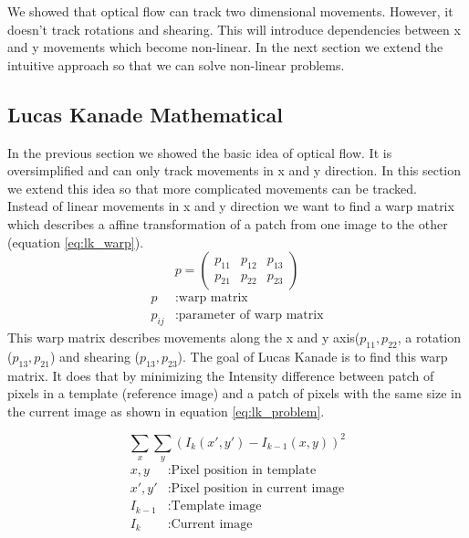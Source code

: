 \documentclass[11pt,a4paper,titlepage,oneside]{report}
\begin{document}
We showed that optical flow can track two dimensional movements. However, it doesn't track rotations and shearing. This will introduce dependencies between x and y movements which become non-linear. In the next section we extend the intuitive approach so that we can solve non-linear problems.

\subsection{Lucas Kanade Mathematical}

In the previous section we showed the basic idea of optical flow. It is oversimplified and can only track movements in x and y direction. In this section we extend this idea so that more complicated movements can be tracked.\\

Instead of linear movements in x and y direction we want to find a warp matrix which describes a affine transformation of a patch from one image to the other (equation \ref{eq:lk_warp}).
\begin{equation}\label{eq:lk_warp}
	p=\begin{pmatrix}
		p_{11} & p_{12} & p_{13} \\
		p_{21} & p_{22} & p_{23}
	\end{pmatrix}
\end{equation}
\begin{align*}
	p				&:	\text{warp matrix}\\
	p_{ij}	&:	\text{parameter of warp matrix}
\end{align*}
This warp matrix describes movements along the x and y axis($p_{11},p_{22}$, a rotation ($p_{13},p_{21}$) and shearing ($p_{13},p_{23}$). The goal of Lucas Kanade is to find this warp matrix. It does that by minimizing the Intensity difference between patch of pixels in a template (reference image) and a patch of pixels with the same size in the current image as shown in equation \ref{eq:lk_problem}. 

\begin{equation}\label{eq:lk_problem}
	\sum_x\sum_y(I_{k}(x',y')-I_{k-1}(x,y))^2
\end{equation}
\begin{align*}
	x,y				&:	\text{Pixel position in template}\\
	x',y'			&:	\text{Pixel position in current image}\\
	I_{k-1}		&:	\text{Template image}\\
	I_{k}			&:	\text{Current image}
\end{align*}
\end{document}
